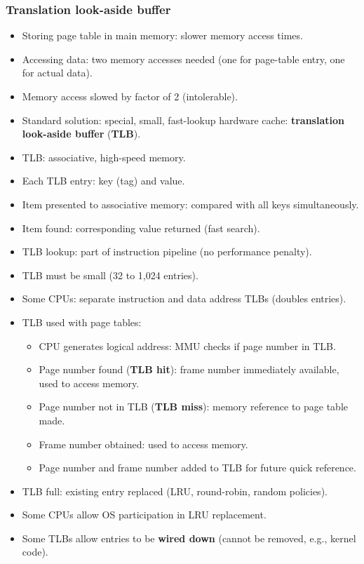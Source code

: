 \subsubsection*{Translation look-aside buffer}
\begin{itemize}
    \item Storing page table in main memory: slower memory access times.
    \item Accessing data: two memory accesses needed (one for page-table entry, one for actual data).
    \item Memory access slowed by factor of 2 (intolerable).
    \item Standard solution: special, small, fast-lookup hardware cache: \textbf{translation look-aside buffer} (\textbf{TLB}).
    \item TLB: associative, high-speed memory.
    \item Each TLB entry: key (tag) and value.
    \item Item presented to associative memory: compared with all keys simultaneously.
    \item Item found: corresponding value returned (fast search).
    \item TLB lookup: part of instruction pipeline (no performance penalty).
    \item TLB must be small (32 to 1,024 entries).
    \item Some CPUs: separate instruction and data address TLBs (doubles entries).
    \item TLB used with page tables:
    \begin{itemize}
        \item CPU generates logical address: MMU checks if page number in TLB.
        \item Page number found (\textbf{TLB hit}): frame number immediately available, used to access memory.
        \item Page number not in TLB (\textbf{TLB miss}): memory reference to page table made.
        \item Frame number obtained: used to access memory.
        \item Page number and frame number added to TLB for future quick reference.
    \end{itemize}
    \item TLB full: existing entry replaced (LRU, round-robin, random policies).
    \item Some CPUs allow OS participation in LRU replacement.
    \item Some TLBs allow entries to be \textbf{wired down} (cannot be removed, e.g., kernel code).

\end{itemize}
